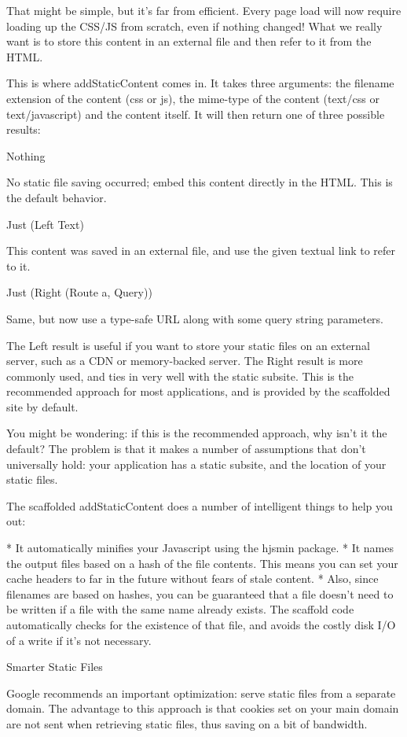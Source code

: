 That might be simple, but it's far from efficient. Every page load will now require loading up the CSS/JS from scratch, even if nothing changed! What we really want is to store this content in an external file and then refer to it from the HTML.

This is where addStaticContent comes in. It takes three arguments: the filename extension of the content (css or js), the mime-type of the content (text/css or text/javascript) and the content itself. It will then return one of three possible results:

Nothing

No static file saving occurred; embed this content directly in the HTML. This is the default behavior.

Just (Left Text)

This content was saved in an external file, and use the given textual link to refer to it.

Just (Right (Route a, Query))

Same, but now use a type-safe URL along with some query string parameters.

The Left result is useful if you want to store your static files on an external server, such as a CDN or memory-backed server. The Right result is more commonly used, and ties in very well with the static subsite. This is the recommended approach for most applications, and is provided by the scaffolded site by default.

You might be wondering: if this is the recommended approach, why isn't it the default? The problem is that it makes a number of assumptions that don't universally hold: your application has a static subsite, and the location of your static files.

The scaffolded addStaticContent does a number of intelligent things to help you out:

* It automatically minifies your Javascript using the hjsmin package.
* It names the output files based on a hash of the file contents. This means you can set your cache headers to far in the future without fears of stale content.
* Also, since filenames are based on hashes, you can be guaranteed that a file doesn't need to be written if a file with the same name already exists. The scaffold code automatically checks for the existence of that file, and avoids the costly disk I/O of a write if it's not necessary.

Smarter Static Files

Google recommends an important optimization: serve static files from a separate domain. The advantage to this approach is that cookies set on your main domain are not sent when retrieving static files, thus saving on a bit of bandwidth.

